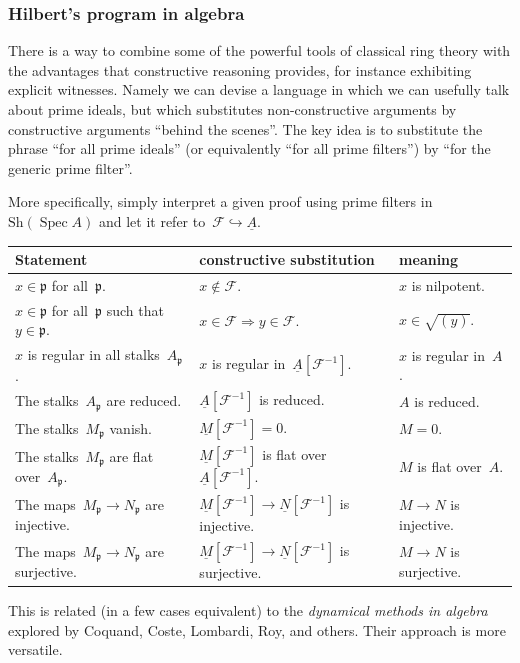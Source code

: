 \documentclass[12pt,utf8,notheorems,compress,t]{beamer}
\newcommand{\F}{\mathcal{F}}
\newcommand{\ppp}{\mathfrak{p}}
\newcommand{\Sh}{\mathrm{Sh}}
\DeclareMathOperator{\Spec}{Spec}
\renewcommand{\_}{\mathpunct{.}}
\newcommand{\?}{\,{:}\,}
\newcommand{\ull}[1]{\underline{#1}}
\newcounter{framenumberpreappendix}
\newcommand{\backupend}{
  \addtocounter{framenumberpreappendix}{-\value{framenumber}}
  \addtocounter{framenumber}{\value{framenumberpreappendix}} 
}
\begin{document}
\begin{frame}\frametitle{Hilbert's program in algebra}
  \scriptsize\justifying
  There is a way to combine some of the powerful tools of classical ring theory
  with the advantages that constructive reasoning provides, for instance
  exhibiting explicit witnesses. Namely we can devise
  a language in which we can usefully talk about prime ideals, but which
  substitutes non-constructive arguments by constructive arguments ``behind
  the scenes''. The key idea is to substitute the phrase ``for all prime ideals''
  (or equivalently ``for all prime filters'') by ``for the generic prime filter''.

  More specifically, simply interpret a given proof using prime filters
  in~$\Sh(\Spec A)$ and let it refer to~$\F \hookrightarrow \underline{A}$.

  \hspace*{-0.75cm}%
  \begin{tabular}{lll}
    \toprule
    Statement & constructive substitution & meaning \\\midrule
    $x \in \ppp$ for all~$\ppp$. &
    $x \not\in \F$. &
    $x$ is nilpotent. \\
    $x \in \ppp$ for all~$\ppp$ such that~$y \in \ppp$. &
    $x \in \F \Rightarrow y \in \F$. &
    $x \in \sqrt{(y)}$. \\
    $x$ is regular in all stalks~$A_\ppp$. &
    $x$ is regular in~$\ull{A}[\F^{-1}]$. &
    $x$ is regular in~$A$. \\
    The stalks~$A_\ppp$ are reduced. &
    $\ull{A}[\F^{-1}]$ is reduced. &
    $A$ is reduced. \\
    The stalks~$M_\ppp$ vanish. &
    $\ull{M}[\F^{-1}] = 0$. &
    $M = 0$. \\
    The stalks~$M_\ppp$ are flat over~$A_\ppp$. &
    $\ull{M}[\F^{-1}]$ is flat over~$\ull{A}[\F^{-1}]$. &
    $M$ is flat over~$A$. \\
    The maps~$M_\ppp \to N_\ppp$ are injective. &
    $\ull{M}[\F^{-1}] \to \ull{N}[\F^{-1}]$ is injective. &
    $M \to N$ is injective. \\
    The maps~$M_\ppp \to N_\ppp$ are surjective. &
    $\ull{M}[\F^{-1}] \to \ull{N}[\F^{-1}]$ is surjective. &
    $M \to N$ is surjective. \\
    \bottomrule
  \end{tabular}

  This is related (in a few cases equivalent) to the \emph{dynamical methods in
  algebra} explored by Coquand, Coste, Lombardi, Roy, and others. Their
  approach is more versatile.
  \par
\end{frame}

\backupend
\end{document}
